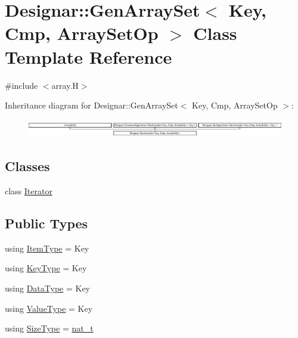 \hypertarget{class_designar_1_1_gen_array_set}{}\section{Designar\+:\+:Gen\+Array\+Set$<$ Key, Cmp, Array\+Set\+Op $>$ Class Template Reference}
\label{class_designar_1_1_gen_array_set}


{\ttfamily \#include $<$array.\+H$>$}

Inheritance diagram for Designar\+:\+:Gen\+Array\+Set$<$ Key, Cmp, Array\+Set\+Op $>$\+:\begin{figure}[H]
\begin{center}
\leavevmode
\includegraphics[height=0.782669cm]{class_designar_1_1_gen_array_set}
\end{center}
\end{figure}
\subsection*{Classes}
\begin{DoxyCompactItemize}
\item 
class \hyperlink{class_designar_1_1_gen_array_set_1_1_iterator}{Iterator}
\end{DoxyCompactItemize}
\subsection*{Public Types}
\begin{DoxyCompactItemize}
\item 
using \hyperlink{class_designar_1_1_gen_array_set_a4db3cb71a2b2f88fee2a5f66688e5230}{Item\+Type} = Key
\item 
using \hyperlink{class_designar_1_1_gen_array_set_a21195191743cf71430c939225a2c8d60}{Key\+Type} = Key
\item 
using \hyperlink{class_designar_1_1_gen_array_set_ac69f0c0b76358cd5effd2dc05bd724ee}{Data\+Type} = Key
\item 
using \hyperlink{class_designar_1_1_gen_array_set_aef777cbce261e3d5df5f03c632a7c8c2}{Value\+Type} = Key
\item 
using \hyperlink{class_designar_1_1_gen_array_set_aabe7047d492721160f291bf40ecf7745}{Size\+Type} = \hyperlink{namespace_designar_aa72662848b9f4815e7bf31a7cf3e33d1}{nat\+\_\+t}
\end{DoxyCompactItemize}
